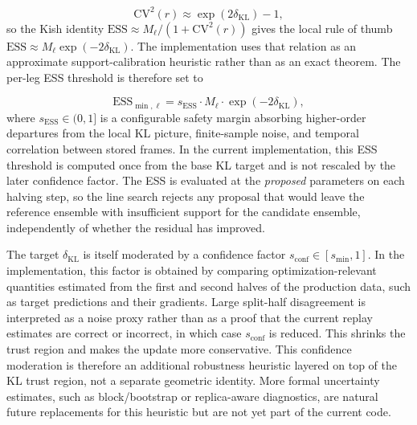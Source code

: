 \begin{equation}
    \mathrm{CV}^2(r)
    \approx
    \exp\!\left(2\delta_{\mathrm{KL}}\right) - 1,
\end{equation}
%
so the Kish identity $\mathrm{ESS} \approx M_\ell /(1+\mathrm{CV}^2(r))$ gives the local rule of thumb $\mathrm{ESS} \approx M_\ell \exp(-2\delta_{\mathrm{KL}})$. The implementation uses that relation as an approximate support-calibration heuristic rather than as an exact theorem. The per-leg ESS threshold is therefore set to

\begin{equation}
    \mathrm{ESS}_{\min,\ell} = s_{\mathrm{ESS}} \cdot M_\ell \cdot \exp\!\left(-2\delta_{\mathrm{KL}}\right),
    \label{eq:essthreshold}
\end{equation}
%
where $s_{\mathrm{ESS}} \in (0,1]$ is a configurable safety margin absorbing higher-order departures from the local KL picture, finite-sample noise, and temporal correlation between stored frames. In the current implementation, this ESS threshold is computed once from the base KL target and is not rescaled by the later confidence factor. The ESS is evaluated at the \emph{proposed} parameters on each halving step, so the line search rejects any proposal that would leave the reference ensemble with insufficient support for the candidate ensemble, independently of whether the residual has improved.

The target $\delta_{\mathrm{KL}}$ is itself moderated by a confidence factor $s_{\mathrm{conf}} \in [s_{\min}, 1]$. In the implementation, this factor is obtained by comparing optimization-relevant quantities estimated from the first and second halves of the production data, such as target predictions and their gradients. Large split-half disagreement is interpreted as a noise proxy rather than as a proof that the current replay estimates are correct or incorrect, in which case $s_{\mathrm{conf}}$ is reduced. This shrinks the trust region and makes the update more conservative. This confidence moderation is therefore an additional robustness heuristic layered on top of the KL trust region, not a separate geometric identity. More formal uncertainty estimates, such as block/bootstrap or replica-aware diagnostics, are natural future replacements for this heuristic but are not yet part of the current code.

